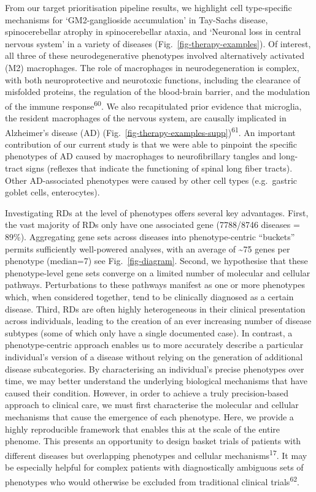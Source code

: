 \documentclass[
]{agujournal2019}
\begin{document}
From our target prioritisation pipeline results, we highlight cell
type-specific mechanisms for `GM2-ganglioside accumulation' in Tay-Sachs
disease, spinocerebellar atrophy in spinocerebellar ataxia, and
`Neuronal loss in central nervous system' in a variety of diseases
(Fig.~\ref{fig-therapy-examples}). Of interest, all three of these
neurodegenerative phenotypes involved alternatively activated (M2)
macrophages. The role of macrophages in neurodegeneration is complex,
with both neuroprotective and neurotoxic functions, including the
clearance of misfolded proteins, the regulation of the blood-brain
barrier, and the modulation of the immune response\textsuperscript{60}.
We also recapitulated prior evidence that microglia, the resident
macrophages of the nervous system, are causally implicated in
Alzheimer's disease (AD)
(Fig.~\ref{fig-therapy-examples-supp})\textsuperscript{61}. An important
contribution of our current study is that we were able to pinpoint the
specific phenotypes of AD caused by macrophages to neurofibrillary
tangles and long-tract signs (reflexes that indicate the functioning of
spinal long fiber tracts). Other AD-associated phenotypes were caused by
other cell types (e.g.~gastric goblet cells, enterocytes).

Investigating RDs at the level of phenotypes offers several key
advantages. First, the vast majority of RDs only have one associated
gene (7788/8746 diseases = 89\%). Aggregating gene sets across diseases
into phenotype-centric ``buckets'' permits sufficiently well-powered
analyses, with an average of \textasciitilde75 genes per phenotype
(median=7) see Fig.~\ref{fig-diagram}. Second, we hypothesise that these
phenotype-level gene sets converge on a limited number of molecular and
cellular pathways. Perturbations to these pathways manifest as one or
more phenotypes which, when considered together, tend to be clinically
diagnosed as a certain disease. Third, RDs are often highly
heterogeneous in their clinical presentation across individuals, leading
to the creation of an ever increasing number of disease subtypes (some
of which only have a single documented case). In contrast, a
phenotype-centric approach enables us to more accurately describe a
particular individual's version of a disease without relying on the
generation of additional disease subcategories. By characterising an
individual's precise phenotypes over time, we may better understand the
underlying biological mechanisms that have caused their condition.
However, in order to achieve a truly precision-based approach to
clinical care, we must first characterise the molecular and cellular
mechanisms that cause the emergence of each phenotype. Here, we provide
a highly reproducible framework that enables this at the scale of the
entire phenome. This presents an opportunity to design basket trials of
patients with different diseases but overlapping phenotypes and cellular
mechanisms\textsuperscript{17}. It may be especially helpful for complex
patients with diagnostically ambiguous sets of phenotypes who would
otherwise be excluded from traditional clinical
trials\textsuperscript{62}.
\end{document}
